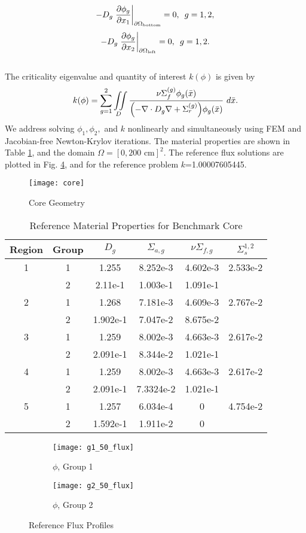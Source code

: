 \begin{equation}
-D_g\eval{\pdv{\phi_g}{x_1}}_{\partial \Omega_\text{bottom}}=0,\hspace{5pt} g=1,2,
\end{equation}
\begin{equation}
-D_g\eval{\pdv{\phi_g}{x_2}}_{\partial \Omega_\text{left}}=0,\hspace{5pt} g=1,2.
\end{equation}
\\
The criticality eigenvalue and quantity of interest $k(\phi)$ is given by
\begin{equation}
k(\phi)=\sum_{g=1}^2\iint\limits_D\frac{\nu\Sigma_{f}^{(g)}\phi_g(\bar x)}{\qty(-\nabla\cdot D_g\nabla+\Sigma_r^{(g)})\phi_g(\bar x)}~d\bar x.
\end{equation}
We address solving $\phi_1,\phi_2,$ and $k$ nonlinearly and simultaneously using FEM and Jacobian-free
Newton-Krylov iterations.  
The material properties are shown in Table \ref{tab:coremats}, and the domain $\Omega=[0,200\text{ cm}]^2$.
The reference flux solutions are plotted in Fig. \ref{benchflux}, and for the reference problem
$k$=1.00007605445.  \begin{figure}[H]
\centering
  \texttt{[image: core]}
  \caption{Core Geometry}
  \label{geom}
\end{figure}
\begin{table}[h]
\centering
\begin{tabular}{c c | c c c c}
Region & Group & $D_g$ & $\Sigma_{a,g}$ & $\nu\Sigma_{f,g}$ & $\Sigma_s^{1,2}$ \\ \hline
1 & 1 & 1.255 & 8.252e-3 & 4.602e-3 & 2.533e-2 \\
 & 2 & 2.11e-1 & 1.003e-1 & 1.091e-1 & \\ \hline
2 & 1 & 1.268 & 7.181e-3 & 4.609e-3 & 2.767e-2 \\
 & 2 & 1.902e-1 & 7.047e-2 & 8.675e-2 & \\ \hline
3 & 1 & 1.259 & 8.002e-3 & 4.663e-3 & 2.617e-2 \\
 & 2 & 2.091e-1 & 8.344e-2 & 1.021e-1 & \\ \hline
4 & 1 & 1.259 & 8.002e-3 & 4.663e-3 & 2.617e-2 \\
 & 2 & 2.091e-1 & 7.3324e-2 & 1.021e-1 & \\ \hline
5 & 1 & 1.257 & 6.034e-4 & 0 & 4.754e-2 \\
 & 2 & 1.592e-1 & 1.911e-2 & 0 & 
\end{tabular}
\caption{Reference Material Properties for Benchmark Core}
\label{tab:coremats}
\end{table}
\begin{figure}[H]
\centering
  \begin{subfigure}[b]{0.45 \textwidth}
   \texttt{[image: g1\_50\_flux]}
   \caption{$\phi$, Group 1}
   \label{g1}
  \end{subfigure}
  \begin{subfigure}[b]{0.45 \textwidth}
   \texttt{[image: g2\_50\_flux]}
   \caption{$\phi$, Group 2}
   \label{g2}
  \end{subfigure}
  \caption{Reference Flux Profiles}
  \label{benchflux}
\end{figure}
